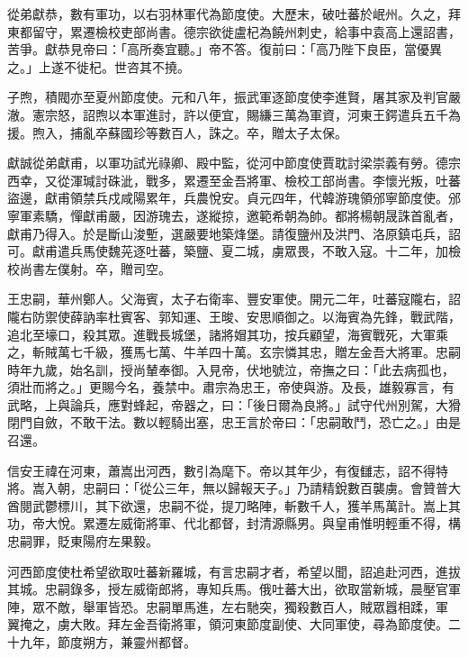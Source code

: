 \begin{pinyinscope}
 從弟獻恭，數有軍功，以右羽林軍代為節度使。大歷末，破吐蕃於岷州。久之，拜東都留守，累遷檢校吏部尚書。德宗欲徙盧杞為饒州刺史，給事中袁高上還詔書，苦爭。獻恭見帝曰：「高所奏宜聽。」帝不答。復前曰：「高乃陛下良臣，當優異之。」上遂不徙杞。世咨其不撓。



 子煦，積閥亦至夏州節度使。元和八年，振武軍逐節度使李進賢，屠其家及判官嚴澈。憲宗怒，詔煦以本軍進討，許以便宜，賜縑三萬為軍資，河東王鍔遣兵五千為援。煦入，捕亂卒蘇國珍等數百人，誅之。卒，贈太子太保。



 獻誠從弟獻甫，以軍功試光祿卿、殿中監，從河中節度使賈耽討梁崇義有勞。德宗西幸，又從渾瑊討硃泚，戰多，累遷至金吾將軍、檢校工部尚書。李懷光叛，吐蕃盜邊，獻甫領禁兵戍咸陽累年，兵農悅安。貞元四年，代韓游瑰領邠寧節度使。邠寧軍素驕，憚獻甫嚴，因游瑰去，遂縱掠，邀範希朝為帥。都將楊朝晟誅首亂者，獻甫乃得入。於是斷山浚塹，選嚴要地築烽堡。請復鹽州及洪門、洛原鎮屯兵，詔可。獻甫遣兵馬使魏茪逐吐蕃，築鹽、夏二城，虜眾畏，不敢入寇。十二年，加檢校尚書左僕射。卒，贈司空。



 王忠嗣，華州鄭人。父海賓，太子右衛率、豐安軍使。開元二年，吐蕃寇隴右，詔隴右防禦使薛訥率杜賓客、郭知運、王晙、安思順御之。以海賓為先鋒，戰武階，追北至壕口，殺其眾。進戰長城堡，諸將媢其功，按兵顧望，海賓戰死，大軍乘之，斬賊萬七千級，獲馬七萬、牛羊四十萬。玄宗憐其忠，贈左金吾大將軍。忠嗣時年九歲，始名訓，授尚輦奉御。入見帝，伏地號泣，帝撫之曰：「此去病孤也，須壯而將之。」更賜今名，養禁中。肅宗為忠王，帝使與游。及長，雄毅寡言，有武略，上與論兵，應對蜂起，帝器之，曰：「後日爾為良將。」試守代州別駕，大猾閉門自斂，不敢干法。數以輕騎出塞，忠王言於帝曰：「忠嗣敢鬥，恐亡之。」由是召還。



 信安王禕在河東，蕭嵩出河西，數引為麾下。帝以其年少，有復讎志，詔不得特將。嵩入朝，忠嗣曰：「從公三年，無以歸報天子。」乃請精銳數百襲虜。會贊普大酋閱武鬱標川，其下欲還，忠嗣不從，提刀略陣，斬數千人，獲羊馬萬計。嵩上其功，帝大悅。累遷左威衛將軍、代北都督，封清源縣男。與皇甫惟明輕重不得，構忠嗣罪，貶東陽府左果毅。


河西節度使杜希望欲取吐蕃新羅城，有言忠嗣才者，希望以聞，詔追赴河西，進拔其城。忠嗣錄多，授左威衛郎將，專知兵馬。俄吐蕃大出，欲取當新城，晨壓官軍陣，眾不敵，舉軍皆恐。忠嗣單馬進，左右馳突，獨殺數百人，賊眾囂相蹂，軍
 翼掩之，虜大敗。拜左金吾衛將軍，領河東節度副使、大同軍使，尋為節度使。二十九年，節度朔方，兼靈州都督。




\end{pinyinscope}
